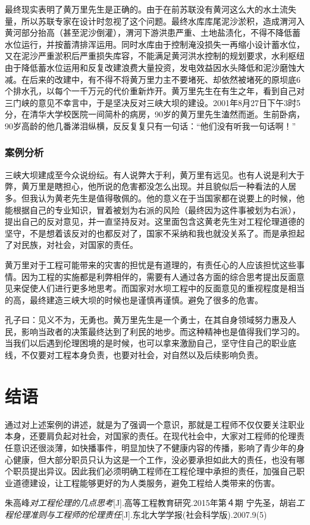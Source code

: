 \documentclass[a4paper,12pt]{ctexart}
\begin{document}
最终现实表明了黄万里先生是正确的。由于在前苏联没有黄河这么大的水土流失量，所以苏联专家在设计时忽视了这个问题。最终水库库尾泥沙淤积，造成渭河入黄河部分抬高（甚至泥沙倒灌），渭河下游洪患严重、土地盐渍化，不得不降低蓄水位运行，并按蓄清排浑运用。同时水库由于控制淹没损失一再缩小设计蓄水位，又在泥沙严重淤积后严重损失库容，不能满足黄河洪水控制的规划要求，水利枢纽由于降低蓄水位运用和反复改建浪费大量投资，发电效益因水头降低和泥沙磨蚀大减。在后来的改建中，有不得不将黄万里力主不要堵死、却依然被堵死的原坝底6个排水孔，以每个一千万元的代价重新炸开。黄万里先生在有生之年，看到自己对三门峡的意见不幸言中，于是坚决反对三峡大坝的建设。2001年8月27日下午3时5分，在清华大学校医院一间简朴的病房，90岁的黄万里先生溘然而逝。生前卧病，90岁高龄的他几番涕泪纵横，反反复复只有一句话：“他们没有听我一句话啊！”

\subsubsection{案例分析}
三峡大坝建成至今众说纷纭。有人说弊大于利，黄万里有远见。也有人说是利大于弊，黄万里是瞎担心，他所说的危害都没怎么出现。并且貌似后一种看法的人居多。但我认为黄老先生是值得敬佩的。他的意义在于当国家都在说要上的时候，他能根据自己的专业知识，冒着被划为右派的风险（最终因为这件事被划为右派），提出自己的反对意见，并一直坚持反对。这里面包含这黄老先生对工程伦理道德的坚守，不是想着该反对的也都反对了，国家不采纳和我也就没关系了。而是承担起了对民族，对社会，对国家的责任。

黄万里对于工程可能带来的灾害的担忧是有道理的，有责任心的人应该担忧这些事情。因为工程的实施都是利弊相伴的，需要有人通过各方面的综合思考提出反面意见来促使人们进行更多地思考。而国家对水坝工程中的反面意见的重视程度是相当的高，最终建造三峡大坝的时候也是谨慎再谨慎。避免了很多的危害。

孔子曰：见义不为，无勇也。黄万里先生是一个勇士，在其自身领域努力惠及人民，影响当政者的决策最终达到了利民的地步。而这种精神也是值得我们学习的。当我们以后遇到伦理困境的是时候，也可以拿来激励自己，坚守住自己的职业底线，不仅要对工程本身负责，也要对社会，对自然以及后续影响负责。



\section{结语}

通过对上述案例的讲述，就是为了强调一个意识，那就是工程师不仅仅要关注职业本身，还要肩负起对社会，对国家的责任。在现代社会中，大家对工程师的伦理责任意识还很淡薄，如快播事件，明显加快了不健康内容的传播，影响了青少年的身心健康，但大部分职员只认为这是一个工作，没必要承担如此大的责任，也没有哪个职员提出异议。因此我们必须明确工程师在工程伦理中承担的责任，加强自己职业道德建设，让工程能够更好的为人类服务，避免工程给人类带来的伤害。

\begin{thebibliography}{99}

朱高峰\emph{对工程伦理的几点思考}[J].高等工程教育研究.2015年第４期
  宁先圣，胡岩\emph{工程伦理准则与工程师的伦理责任}[J].东北大学学报(社会科学版).2007.9(5)
  
\end{thebibliography}
\end{document}
